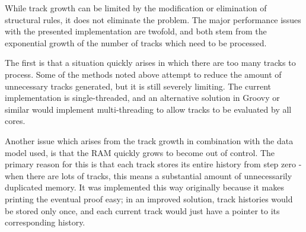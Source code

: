 \documentclass{article}
\begin{document}
While track growth can be limited by the modification or elimination of
structural rules, it does not eliminate the problem. The major performance 
issues with the presented implementation are twofold, and both stem from the 
exponential growth of the number of tracks which need to be processed.

The first is that a situation quickly arises in which there are too many tracks
to process. Some of the methods noted above attempt to reduce the amount of
unnecessary tracks generated, but it is still severely limiting. The current
implementation is single-threaded, and an alternative solution in Groovy or
similar would implement multi-threading to allow tracks to be evaluated by all
cores.

Another issue which arises from the track growth in combination with the data
model used, is that the RAM quickly grows to become out of control. The primary
reason for this is that each track stores its entire history from step zero -
when there are lots of tracks, this means a substantial amount of unnecessarily
duplicated memory. It was implemented this way originally because it makes 
printing the eventual proof easy; in an improved solution, track histories would
be stored only once, and each current track would just have a pointer to its
corresponding history.
\end{document}
